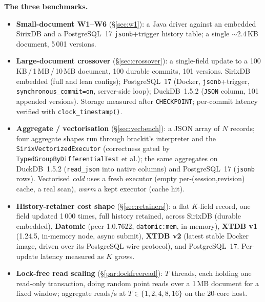 \documentclass[11pt,a4paper,oneside]{report}
\theoremstyle{sirixthm}
\newcommand{\code}[1]{\texttt{#1}}
\begin{document}
\textbf{The three benchmarks.}
\begin{itemize}[leftmargin=1.4em]
\item \textbf{Small-document W1--W6} (\S\ref{sec:w1}): a Java driver against an embedded SirixDB and a
  PostgreSQL~17 \code{jsonb}{+}trigger history table; a single $\sim$2.4\,KB document, 5\,001 versions.
\item \textbf{Large-document crossover} (\S\ref{sec:crossover}): a single-field update to a
  100\,KB\,/\,1\,MB\,/\,10\,MB document, 100 durable commits, 101 versions. SirixDB embedded (full and lean
  configs); PostgreSQL~17 (Docker, \code{jsonb}{+}trigger, \code{synchronous\_commit=on}, server-side
  loop); DuckDB~1.5.2 (\code{JSON} column, 101 appended versions). Storage measured after
  \code{CHECKPOINT}; per-commit latency verified with \code{clock\_timestamp()}.
\item \textbf{Aggregate / vectorisation} (\S\ref{sec:vecbench}): a JSON array of $N$ records; four
  aggregate shapes run through brackit's interpreter and the \code{SirixVectorizedExecutor} (correctness
  gated by \code{TypedGroupByDifferentialTest} et al.); the same aggregates on DuckDB~1.5.2
  (\code{read\_json} into native columns) and PostgreSQL~17 (\code{jsonb} rows). Vectorised \emph{cold}
  uses a fresh executor (empty per-(session,revision) cache, a real scan), \emph{warm} a kept executor
  (cache hit).
\item \textbf{History-retainer cost shape} (\S\ref{sec:retainers}): a flat $K$-field record, one field
  updated 1\,000 times, full history retained, across SirixDB (durable embedded), \textbf{Datomic} (peer
  1.0.7622, \code{datomic:mem}, in-memory), \textbf{XTDB v1} (1.24.5, in-memory node, async submit),
  \textbf{XTDB v2} (latest stable Docker image, driven over its PostgreSQL wire protocol), and
  PostgreSQL~17. Per-update latency measured as $K$ grows.
\item \textbf{Lock-free read scaling} (\S\ref{par:lockfreeread}): $T$ threads, each holding one read-only
  transaction, doing random point reads over a 1\,MB document for a fixed window; aggregate reads/s at
  $T\in\{1,2,4,8,16\}$ on the 20-core host.
\end{itemize}
\end{document}
